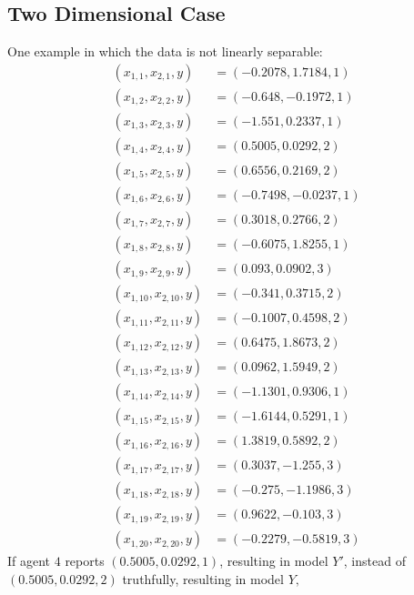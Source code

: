 \documentclass{article}
\begin{document}
\subsection{Two Dimensional Case}
One example in which the data is not linearly separable:
\begin{align*}
\left(x_{1,1}, x_{2,1}, y\right) &= \left(-0.2078, 1.7184, 1\right)
\\ \left(x_{1,2}, x_{2,2}, y\right) &= \left(-0.648, -0.1972, 1\right)
\\ \left(x_{1,3}, x_{2,3}, y\right) &= \left(-1.551, 0.2337, 1\right)
\\ \left(x_{1,4}, x_{2,4}, y\right) &= \left(0.5005, 0.0292, 2\right)
\\ \left(x_{1,5}, x_{2,5}, y\right) &= \left(0.6556, 0.2169, 2\right)
\\ \left(x_{1,6}, x_{2,6}, y\right) &= \left(-0.7498, -0.0237, 1\right)
\\ \left(x_{1,7}, x_{2,7}, y\right) &= \left(0.3018, 0.2766, 2\right)
\\ \left(x_{1,8}, x_{2,8}, y\right) &= \left(-0.6075, 1.8255, 1\right)
\\ \left(x_{1,9}, x_{2,9}, y\right) &= \left(0.093, 0.0902, 3\right)
\\ \left(x_{1,10}, x_{2,10}, y\right) &= \left(-0.341, 0.3715, 2\right)
\\ \left(x_{1,11}, x_{2,11}, y\right) &= \left(-0.1007, 0.4598, 2\right)
\\ \left(x_{1,12}, x_{2,12}, y\right) &= \left(0.6475, 1.8673, 2\right)
\\ \left(x_{1,13}, x_{2,13}, y\right) &= \left(0.0962, 1.5949, 2\right)
\\ \left(x_{1,14}, x_{2,14}, y\right) &= \left(-1.1301, 0.9306, 1\right)
\\ \left(x_{1,15}, x_{2,15}, y\right) &= \left(-1.6144, 0.5291, 1\right)
\\ \left(x_{1,16}, x_{2,16}, y\right) &= \left(1.3819, 0.5892, 2\right)
\\ \left(x_{1,17}, x_{2,17}, y\right) &= \left(0.3037, -1.255, 3\right)
\\ \left(x_{1,18}, x_{2,18}, y\right) &= \left(-0.275, -1.1986, 3\right)
\\ \left(x_{1,19}, x_{2,19}, y\right) &= \left(0.9622, -0.103, 3\right)
\\ \left(x_{1,20}, x_{2,20}, y\right) &= \left(-0.2279, -0.5819, 3\right)
\end{align*}
If agent $4$ reports $\left(0.5005, 0.0292, 1\right)$, resulting in model $Y'$, instead of $\left(0.5005, 0.0292, 2\right)$ truthfully, resulting in model $Y, $
\end{document}
